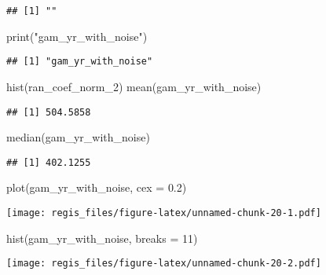 \documentclass[
]{article}
\newenvironment{Shaded}{\begin{snugshade}}{\end{snugshade}}
\newcommand{\AttributeTok}[1]{\textcolor[rgb]{0.77,0.63,0.00}{#1}}
\newcommand{\DecValTok}[1]{\textcolor[rgb]{0.00,0.00,0.81}{#1}}
\newcommand{\FloatTok}[1]{\textcolor[rgb]{0.00,0.00,0.81}{#1}}
\newcommand{\FunctionTok}[1]{\textcolor[rgb]{0.00,0.00,0.00}{#1}}
\newcommand{\NormalTok}[1]{#1}
\newcommand{\StringTok}[1]{\textcolor[rgb]{0.31,0.60,0.02}{#1}}
\begin{document}
\begin{verbatim}
## [1] ""
\end{verbatim}

\begin{Shaded}
\begin{Highlighting}[]
\FunctionTok{print}\NormalTok{(}\StringTok{"gam\_yr\_with\_noise"}\NormalTok{)}
\end{Highlighting}
\end{Shaded}

\begin{verbatim}
## [1] "gam_yr_with_noise"
\end{verbatim}

\begin{Shaded}
\begin{Highlighting}[]
\FunctionTok{hist}\NormalTok{(ran\_coef\_norm\_2)}
\FunctionTok{mean}\NormalTok{(gam\_yr\_with\_noise)}
\end{Highlighting}
\end{Shaded}

\begin{verbatim}
## [1] 504.5858
\end{verbatim}

\begin{Shaded}
\begin{Highlighting}[]
\FunctionTok{median}\NormalTok{(gam\_yr\_with\_noise)}
\end{Highlighting}
\end{Shaded}

\begin{verbatim}
## [1] 402.1255
\end{verbatim}

\begin{Shaded}
\begin{Highlighting}[]
\FunctionTok{plot}\NormalTok{(gam\_yr\_with\_noise, }\AttributeTok{cex =} \FloatTok{0.2}\NormalTok{)}
\end{Highlighting}
\end{Shaded}

\texttt{[image: regis\_files/figure-latex/unnamed-chunk-20-1.pdf]}

\begin{Shaded}
\begin{Highlighting}[]
\FunctionTok{hist}\NormalTok{(gam\_yr\_with\_noise, }\AttributeTok{breaks =} \DecValTok{11}\NormalTok{)}
\end{Highlighting}
\end{Shaded}

\texttt{[image: regis\_files/figure-latex/unnamed-chunk-20-2.pdf]}
\end{document}
